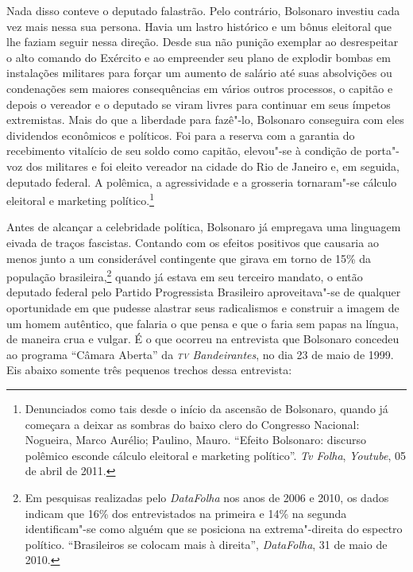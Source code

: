 Nada disso conteve o deputado falastrão. Pelo contrário, Bolsonaro
investiu cada vez mais nessa sua persona. Havia um lastro histórico e um
bônus eleitoral que lhe faziam seguir nessa direção. Desde sua não
punição exemplar ao desrespeitar o alto comando do Exército e ao
empreender seu plano de explodir bombas em instalações militares para
forçar um aumento de salário até suas absolvições ou condenações sem
maiores consequências em vários outros processos, o capitão e depois o
vereador e o deputado se viram livres para continuar em seus ímpetos
extremistas. Mais do que a liberdade para fazê"-lo, Bolsonaro conseguira
com eles dividendos econômicos e políticos. Foi para a reserva com a
garantia do recebimento vitalício de seu soldo como capitão, elevou"-se à
condição de porta"-voz dos militares e foi eleito vereador na cidade do
Rio de Janeiro e, em seguida, deputado federal. A polêmica, a
agressividade e a grosseria tornaram"-se cálculo eleitoral e marketing
político.\footnote{Denunciados como tais desde o início da ascensão de
  Bolsonaro, quando já começara a deixar as sombras do baixo clero do
  Congresso Nacional: Nogueira, Marco Aurélio; Paulino, Mauro. ``Efeito
  Bolsonaro: discurso polêmico esconde cálculo eleitoral e marketing
  político''. \emph{Tv Folha}, \emph{Youtube}, 05 de abril de 2011.}

Antes de alcançar a celebridade política, Bolsonaro já empregava uma
linguagem eivada de traços fascistas. Contando com os efeitos positivos
que causaria ao menos junto a um considerável contingente que girava em
torno de 15\% da população brasileira,\footnote{Em pesquisas realizadas
  pelo \emph{DataFolha} nos anos de 2006 e 2010, os dados indicam que
  16\% dos entrevistados na primeira e 14\% na segunda identificam"-se
  como alguém que se posiciona na extrema"-direita do espectro político.
  ``Brasileiros se colocam mais à direita'', \textit{DataFolha}, 31 de maio de 2010.}
quando já estava em seu terceiro mandato, o então deputado federal pelo
Partido Progressista Brasileiro aproveitava"-se de qualquer oportunidade
em que pudesse alastrar seus radicalismos e construir a imagem de um
homem autêntico, que falaria o que pensa e que o faria sem papas na
língua, de maneira crua e vulgar. É o que ocorreu na entrevista que
Bolsonaro concedeu ao programa ``Câmara Aberta'' da \emph{\textsc{tv}
Bandeirantes}, no dia 23 de maio de 1999. Eis abaixo somente três
pequenos trechos dessa entrevista:

